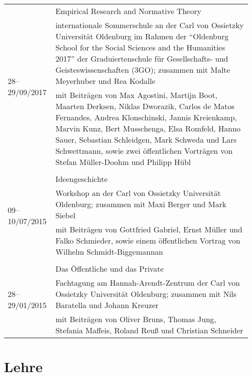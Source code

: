 \documentclass[a4paper,10pt]{article}
\begin{document}
\begin{longtable}{p{}p{}}
\\
\multirow{3}{1,75cm}{\footnotesize{28--29/09/2017}} & Empirical Research and Normative Theory\\
& \footnotesize{internationale Sommerschule an der Carl von Ossietzky Universität Oldenburg im Rahmen der \enquote{Oldenburg School for the Social Sciences and the Humanities 2017} der Graduiertenschule für Gesellschafts- und Geisteswissenschaften (3GO); zusammen mit Malte Meyerhuber und Rea Kodalle}\\
& \footnotesize{mit Beiträgen von Max Agostini, Martijn Boot, Maarten Derksen, Niklas Dworazik, Carlos de Matos Fernandes, Andrea Klonschinski, Jannis Kreienkamp, Marvin Kunz, Bert Musschenga, Elsa Romfeld, Hanno Sauer, Sebastian Schleidgen, Mark Schweda und Lars Schwettmann, sowie zwei öffentlichen Vorträgen von Stefan Müller-Doohm und Philipp Hübl}\\
\\
\multirow{3}{1,75cm}{\footnotesize{09--10/07/2015}} & Ideengeschichte\\
& \footnotesize{Workshop an der Carl von Ossietzky Universität Oldenburg; zusammen mit Maxi Berger und Mark Siebel}\\
& \footnotesize{mit Beiträgen von Gottfried Gabriel, Ernst Müller und Falko Schmieder, sowie einem öffentlichen Vortrag von Wilhelm Schmidt-Biggemannan}\\
\\
\multirow{3}{1,75cm}{\footnotesize{28--29/01/2015}} & Das Öffentliche und das Private\\
& \footnotesize{Fachtagung am Hannah-Arendt-Zentrum der Carl von Ossietzky Universität Oldenburg; zusammen mit Nils Baratella und Johann Kreuzer}\\
& \footnotesize{mit Beiträgen von Oliver Bruns, Thomas Jung, Stefania Maffeis, Roland Reuß und Christian Schneider}\\
\end{longtable}


\section{Lehre}
\end{document}
